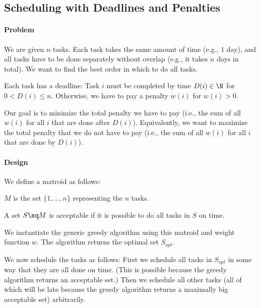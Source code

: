 \subsection{Scheduling with Deadlines and Penalties}

\paragraph{Problem}
We are given $n$ tasks.
Each task takes the same amount of time (e.g., $1$ day), and all tasks have to be done separately without overlap (e.g., it takes $n$ days in total).
We want to find the best order in which to do all tasks.

Each task has a deadline: Task $i$ must be completed by time $D(i)\in \N$ for $0<D(i)\leq n$.
Otherwise, we have to pay a penalty $w(i)$ for $w(i)>0$.

Our goal is to minimize the total penalty we have to pay (i.e., the sum of all $w(i)$ for all $i$ that are done after $D(i)$).
Equivalently, we want to maximize the total penalty that we do not have to pay (i.e., the sum of all $w(i)$ for all $i$ that are done by $D(i)$).

\paragraph{Design}
We define a matroid as follows:
\begin{compactitem}
 \item $M$ is the set $\{1,\ldots,n\}$ representing the $n$ tasks.
 \item A set $S\sq M$ is acceptable if it is possible to do all tasks in $S$ on time.
\end{compactitem}


We instantiate the generic greedy algorithm using this matroid and weight function $w$.
The algorithm returns the optimal set $S_{opt}$.

We now schedule the tasks as follows: First we schedule all tasks in $S_{opt}$ in some way that they are all done on time. (This is possible because the greedy algorithm returns an acceptable set.)
Then we schedule all other tasks (all of which will be late because the greedy algorithm returns a maximally big acceptable set) arbitrarily.

